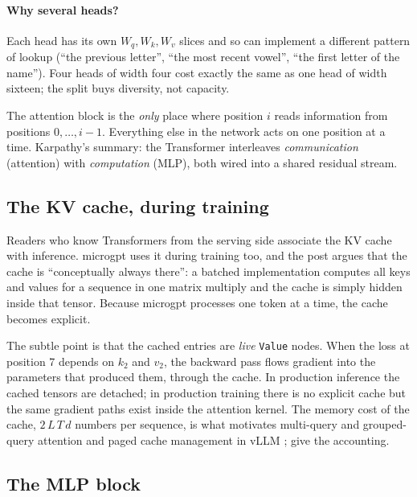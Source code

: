 \documentclass[11pt,letterpaper]{article}
\theoremstyle{remark}
\newcommand{\code}[1]{\lstinline[basicstyle=\ttfamily\small]|#1|}
\begin{document}
\paragraph{Why several heads?} Each head has its own $W_q,W_k,W_v$ slices and so can implement a different pattern of lookup (``the previous letter'', ``the most recent vowel'', ``the first letter of the name''). Four heads of width four cost exactly the same as one head of width sixteen; the split buys diversity, not capacity.

\begin{keyidea}
The attention block is the \emph{only} place where position $i$ reads information from positions $0,\dots,i-1$. Everything else in the network acts on one position at a time. Karpathy's summary: the Transformer interleaves \emph{communication} (attention) with \emph{computation} (MLP), both wired into a shared residual stream.
\end{keyidea}

\subsection{The KV cache, during training}

Readers who know Transformers from the serving side associate the KV cache with inference. microgpt uses it during training too, and the post argues that the cache is ``conceptually always there'': a batched implementation computes all keys and values for a sequence in one matrix multiply and the cache is simply hidden inside that tensor. Because microgpt processes one token at a time, the cache becomes explicit.

The subtle point is that the cached entries are \emph{live} \code{Value} nodes. When the loss at position 7 depends on $k_2$ and $v_2$, the backward pass flows gradient into the parameters that produced them, through the cache. In production inference the cached tensors are detached; in production training there is no explicit cache but the same gradient paths exist inside the attention kernel. The memory cost of the cache, $2\,L\,T\,d$ numbers per sequence, is what motivates multi-query and grouped-query attention \parencite{shazeer2019mqa,ainslie2023gqa} and paged cache management in vLLM \parencite{kwon2023vllm}; \textcite{pope2022efficiently} give the accounting.

\subsection{The MLP block}
\end{document}

